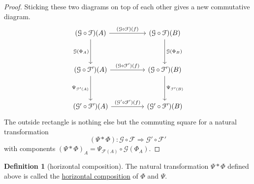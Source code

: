 \documentclass[a4paper]{report}
\newcommand{\defn}[1]{\ul{#1}}
\theoremstyle{definition}
\newtheorem{definition}{Definition}[section]
\theoremstyle{plain}
\theoremstyle{remark}
\begin{document}
\begin{proof}
  Sticking these two diagrams on top of each other gives a new commutative diagram.
  \begin{equation*}
    \begin{tikzcd}[row sep=huge, column sep=huge]
      (\mathcal{G} \circ \mathcal{F})(A)
      \arrow[d, swap, "\mathcal{G}(\Phi_{A})"] 
      \arrow[r, "(\mathcal{G} \circ \mathcal{F})(f)"] 
      & (\mathcal{G} \circ \mathcal{F})(B)
      \arrow[d, "\mathcal{G}(\Phi_{B})"] 
      \\
      (\mathcal{G} \circ \mathcal{F}')(A) 
      \arrow[r, "(\mathcal{G} \circ \mathcal{F}')(f)"] 
      \arrow[d, swap, "\Psi_{\mathcal{F}'(A)}"]
      & (\mathcal{G} \circ \mathcal{F}')(B) 
      \arrow[d, "\Psi_{\mathcal{F}'(B)}"]
      \\
      (\mathcal{G}' \circ \mathcal{F}')(A)
      \arrow[r, "(\mathcal{G}' \circ \mathcal{F}')(f)"]
      & (\mathcal{G}' \circ \mathcal{F}')(B)
    \end{tikzcd}
  \end{equation*}
  The outside rectangle is nothing else but the commuting square for a natural transformation 
  \begin{equation*}
    (\Psi * \Phi)\colon \mathcal{G} \circ \mathcal{F} \Rightarrow \mathcal{G'} \circ \mathcal{F}' 
  \end{equation*}
  with components $(\Psi * \Phi)_{A} = \Psi_{\mathcal{F}(A)} \circ \mathcal{G}(\Phi_{A})$.
\end{proof}

\begin{definition}[horizontal composition]
  \label{def:horizontalcomposition}
  The natural transformation $\Psi * \Phi$ defined above is called the \defn{horizontal composition} of $\Phi$ and $\Psi$.
\end{definition}
\end{document}
